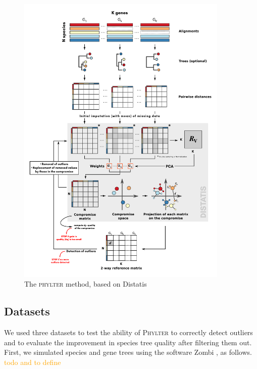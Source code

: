 \documentclass{article}
\begin{document}

\begin{figure}
    \includegraphics[width=0.9\textwidth]{fig/method_2.pdf}
    \caption{The \textsc{phylter} method, based on Distatis}
    \label{fig:method}
\end{figure} 

\subsection{Datasets}
We used three datasets to test the ability of \textsc{Phylter} to correctly detect outliers and to evaluate the improvement in species tree quality after filtering them out.
First, we simulated species and gene trees using the software Zombi \cite{davin_2019}, as follows. \textcolor{orange}{todo and to define}
\end{document}
